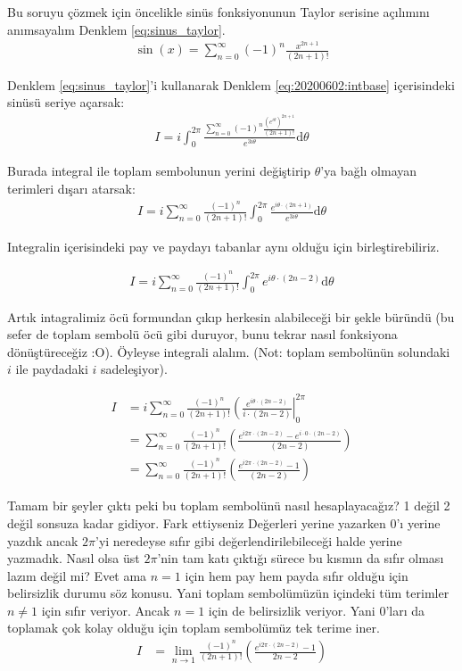 \documentclass{article}
\numberwithin{equation}{section}
\begin{document}
Bu soruyu çözmek için öncelikle sinüs fonksiyonunun Taylor serisine açılımını anımsayalım Denklem \eqref{eq:sinus_taylor}.
%
\begin{align}
\label{eq:sinus_taylor}
	\sin(x) = \sum_{n=0}^{\infty} (-1)^n \frac{x^{2n+1}}{(2n+1)!}
\end{align}

Denklem \eqref{eq:sinus_taylor}'i kullanarak Denklem \eqref{eq:20200602:intbase} içerisindeki sinüsü seriye açarsak: 
%
\begin{align}
 I = i\int_0^{2\pi} \frac{\sum_{n=0}^{\infty} (-1)^n \frac{(e^{i\theta} )^{2n+1}}{(2n+1)!}}{e^{3i\theta}}  \mathrm{d}\theta
\end{align} 

Burada integral ile toplam sembolunun yerini değiştirip $\theta$'ya bağlı olmayan terimleri dışarı atarsak: 
\begin{align}
I = i \sum_{n=0}^{\infty} \frac{(-1)^n}{(2n+1)!}  \int_0^{2\pi} \frac{ e^{i\theta\cdot (2n+1)} }{e^{3i\theta}}  \mathrm{d}\theta
\end{align} 

Integralin içerisindeki pay ve paydayı tabanlar aynı olduğu için birleştirebiliriz.

\begin{align}
I = i \sum_{n=0}^{\infty} \frac{(-1)^n}{(2n+1)!}  \int_0^{2\pi} e^{i\theta\cdot (2n-2)}  \mathrm{d}\theta
\end{align} 

Artık intagralimiz öcü formundan çıkıp herkesin alabileceği bir şekle büründü (bu sefer de toplam sembolü öcü gibi duruyor, bunu tekrar nasıl fonksiyona dönüştüreceğiz :O). Öyleyse integrali alalım. (Not: toplam sembolünün solundaki $i$ ile paydadaki $i$ sadeleşiyor).

\begin{align}
I &= i\sum_{n=0}^{\infty} \frac{(-1)^n}{(2n+1)!} \left( \frac{ e^{i\theta\cdot (2n-2)}  }{i\cdot (2n-2)}\right|_0^{2\pi} \nonumber \\
&= \sum_{n=0}^{\infty} \frac{(-1)^n}{(2n+1)!} \left( \frac{ e^{i2\pi\cdot (2n-2)} -  e^{i\cdot  0\cdot (2n-2)}  }{(2n-2)}\right) \nonumber \\
&= \sum_{n=0}^{\infty} \frac{(-1)^n}{(2n+1)!} \left( \frac{ e^{i2\pi\cdot (2n-2)} -  1  }{(2n-2)}\right)
\end{align} 

Tamam bir şeyler çıktı peki bu toplam sembolünü nasıl hesaplayacağız? 1 değil 2 değil sonsuza kadar gidiyor. Fark ettiyseniz Değerleri yerine yazarken 0'ı yerine yazdık ancak $2\pi$'yi neredeyse sıfır gibi değerlendirilebileceği halde yerine yazmadık. Nasıl olsa üst $2\pi$'nin tam katı çıktığı sürece bu kısmın da sıfır olması lazım değil mi? Evet ama $n=1$ için hem pay hem payda sıfır olduğu için belirsizlik durumu söz konusu. Yani toplam sembolümüzün içindeki tüm terimler $n\neq 1$ için sıfır veriyor. Ancak $n=1$ için de belirsizlik veriyor. Yani 0'ları da toplamak çok kolay olduğu için toplam sembolümüz tek terime iner. 
\begin{align}
I&= \lim_{n \to 1} \frac{(-1)^n}{(2n+1)!} \left( \frac{ e^{i2\pi\cdot (2n-2)} -  1  }{ 2n-2}\right)
\end{align} 
\end{document}
